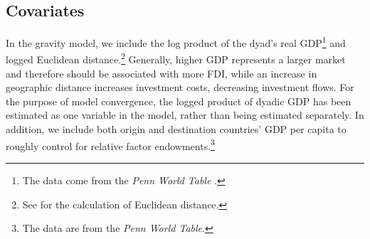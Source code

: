 \documentclass[reqno,onecolumn,letterpaper,12pt]{article}
\begin{document}





\subsection{Covariates}

In the gravity model, we include the log product of the dyad's real GDP\footnote{The data come from the \textit{Penn World Table}  \citep{feenstra2015next}.} and logged Euclidean distance.\footnote{See \citet{mayer2011notes} for the calculation of Euclidean distance.} Generally, higher GDP represents a larger market and therefore should be associated with more FDI, while an increase in geographic distance increases investment costs, decreasing investment flows. For the purpose of model convergence, the logged product of dyadic GDP has been estimated as one variable in the model, rather than being estimated separately. In addition, we include both origin and destination countries' GDP per capita to roughly control for relative factor endowments.\footnote{The data are from the \textit{Penn World Table}.}
\end{document}
